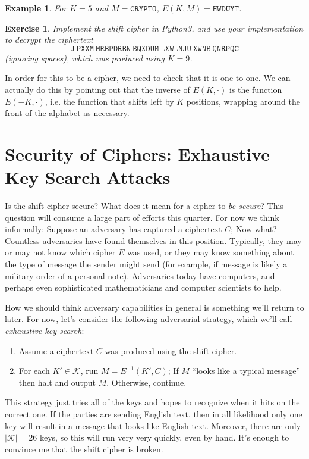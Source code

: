 \documentclass[11pt]{article}
\newtheorem{exercise}{Exercise}
\newtheorem{example}{Example}
\newcommand{\keys}{\mathcal{K}}
\newcommand{\enc}{E}
\newcommand{\dec}{E^{-1}}
\begin{document}
\begin{example}
    For $K=5$ and $M=\mathtt{CRYPTO}$, $\enc(K,M)=\mathtt{HWDUYT}$.
\end{example}

\begin{exercise}
    Implement the shift cipher in Python3, and use your implementation
    to decrypt the ciphertext 
    \[
        \mathtt{J\ PXXM\ MRBPDRBN\ BQXDUM\ LXWLNJU\ XWNB\ QNRPQC}
    \]
    (ignoring spaces), which was produced using $K=9$.
\end{exercise}

In order for this to be a cipher, we need to check that it is one-to-one.
We can actually do this by pointing out that the inverse of $\enc(K,\cdot)$
is the function $\enc(-K,\cdot)$, i.e. the function that shifts left by
$K$ positions, wrapping around the front of the alphabet as necessary.

\section{Security of Ciphers: Exhaustive Key Search Attacks}

Is the shift cipher secure? What does it mean for a cipher to \emph{be secure}?
This question will consume a large part of efforts this quarter. For now we
think informally: Suppose an adversary has captured a ciphertext $C$; Now what?
Countless adversaries have found themselves in this position. Typically,
they may or may not know which cipher $\enc$ was used, or they may know
something about the type of message the sender might send (for example,
if message is likely a military order of a personal note). Adversaries
today have computers, and perhaps even sophisticated mathematicians and
computer scientists to help. 

How we should think adversary capabilities in general is something we'll return
to later. For now, let's consider the following adversarial strategy, which
we'll call \emph{exhaustive key search}: 
\begin{enumerate}
    \item Assume a ciphertext $C$ was produced using the shift cipher. 
        
    \item For each $K'\in\keys$, run $M = \dec(K',C)$; If $M$ ``looks like
        a typical message'' then halt and output $M$. Otherwise, continue.
\end{enumerate}
This strategy just tries all of the keys and hopes to recognize when it hits on
the correct one. If the parties are sending English text, then in all
likelihood only one key will result in a message that looks like English text.
Moreover, there are only $|\keys|=26$ keys, so this will run very very quickly,
even by hand.  It's enough to convince me that the shift cipher is broken.
\end{document}
